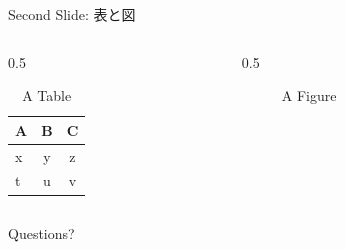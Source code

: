 \documentclass[10pt,aspectratio=169]{beamer}
\begin{document}
\begin{frame}{Second Slide: 表と図}
  \begin{columns}
    \begin{column}{0.5\textwidth}
      \begin{table}
        \caption{A Table}
        \begin{tabular}{l|c c}
          \hline
          A & B & C \\
          \hline
          x & y & z \\
          t & u & v \\
          \hline
        \end{tabular}
      \end{table}
    \end{column}

    \begin{column}{0.5\textwidth}
      \begin{figure}
        \caption{A Figure}
      \end{figure}
    \end{column}
  \end{columns}
\end{frame}

\begin{frame}[standout]
  Questions?
\end{frame}
\end{document}
